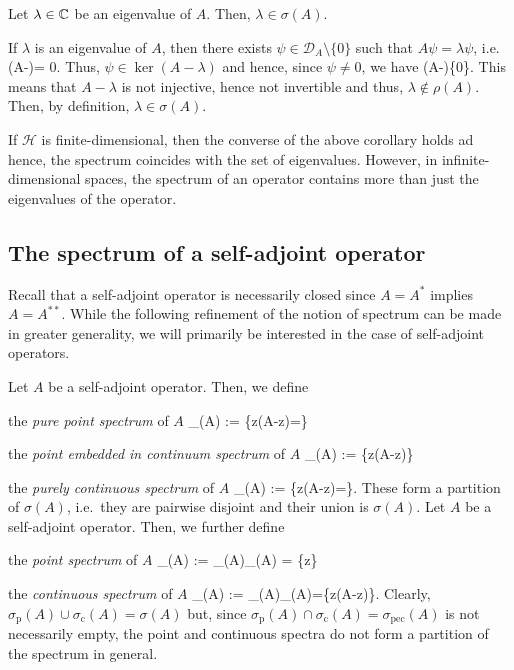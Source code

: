\bc
Let $\lambda\in\mathbb{C}$ be an eigenvalue of $A$. Then, $\lambda\in\sigma(A)$.
\ec

\bq
If $\lambda$ is an eigenvalue of $A$, then there exists $\psi\in\mathcal{D}_A\setminus\{0\}$ such that $A\psi = \lambda \psi$, i.e.\ \bse
(A-\lambda)\psi = 0.
\ese
Thus, $\psi\in\ker(A-\lambda)$ and hence, since $\psi\neq 0$, we have
\bse
\ker(A-\lambda)\neq\{0\}.
\ese
This means that $A-\lambda$ is not injective, hence not invertible and thus, $\lambda\notin\rho(A)$. Then, by definition, $\lambda\in\sigma(A)$.
\eq

\br
If $\mathcal{H}$ is finite-dimensional, then the converse of the above corollary holds ad hence, the spectrum coincides with the set of eigenvalues. However, in infinite-dimensional spaces, the spectrum of an operator contains more than just the eigenvalues of the operator.
\er

\subsection{The spectrum of a self-adjoint operator}

Recall that a self-adjoint operator is necessarily closed since $A=A^*$ implies $A=A^{**}$. While the following refinement of the notion of spectrum can be made in greater generality, we will primarily be interested in the case of self-adjoint operators.

\bd
Let $A$ be a self-adjoint operator. Then, we define
\ben[label=(\roman*)]
\item the \emph{pure point spectrum} of $A$
\bse
\sigma_{}(A) := \{z\in\C\mid \ran(A-z)=\neq{}\}
\ese
\item the \emph{point embedded in continuum spectrum} of $A$
\bse
\sigma_{}(A) := \{z\in\C\mid \ran(A-z)\neq{}\neq{}\}
\ese
\item the \emph{purely continuous spectrum} of $A$
\bse
\sigma_{}(A) := \{z\in\C\mid \ran(A-z)\neq{}=\}.
\ese
\een
\ed
These form a partition of $\sigma(A)$, i.e.\ they are pairwise disjoint and their union is $\sigma(A)$.
\bd
Let $A$ be a self-adjoint operator. Then, we further define
\ben[label=(\roman*)]
\item the \emph{point spectrum} of $A$
\bse
\sigma_{}(A) := \sigma_{}(A)\cup \sigma_{}(A) = \{z\in\C\mid {}\neq{}\}
\ese
\item the \emph{continuous spectrum} of $A$
\bse
\sigma_{}(A) :=  \sigma_{}(A)\cup  \sigma_{}(A)=\{z\in\C\mid \ran(A-z)\neq{}\}.
\ese
\een
\ed
Clearly, $\sigma_{\mathrm{p}}(A) \cup\sigma_{\mathrm{c}}(A) =\sigma(A)$ but, since $\sigma_{\mathrm{p}}(A) \cap\sigma_{\mathrm{c}}(A) = \sigma_{\mathrm{pec}}(A)$ is not necessarily empty, the point and continuous spectra do not form a partition of the spectrum in general.

